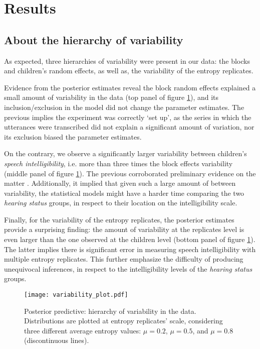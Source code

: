 \section{Results} \label{S:results}
%
\subsection{About the hierarchy of variability} \label{sS:results_variability}
%
As expected, three hierarchies of variability were present in our data: the blocks and children's random effects, as well as, the variability of the entropy replicates.

Evidence from the posterior estimates reveal the block random effects explained a small amount of variability in the data (top panel of figure \ref{fig:variability}), and its inclusion/exclusion in the model did not change the parameter estimates. The previous implies the experiment was correctly `set up', as the series in which the utterances were transcribed did not explain a significant amount of variation, nor its exclusion biased the parameter estimates.

On the contrary, we observe a significantly larger variability between children's \textit{speech intelligibility}, i.e. more than three times the block effects variability (middle panel of figure \ref{fig:variability}). The previous corroborated preliminary evidence on the matter \cite{Young_et_al_2002, Peng_et_al_2004, Montag_et_al_2014, Castellanos_et_al_2014, Yanbay_et_al_2014, Nittrouer_et_al_2014, Freeman_et_al_2017, Boonen_et_al_2021}. Additionally, it implied that given such a large amount of between variability, the statistical models might have a harder time comparing the two \textit{hearing status} groups, in respect to their location on the intelligibility scale.

Finally, for the variability of the entropy replicates, the posterior estimates provide a surprising finding: the amount of variability at the replicates level is even larger than the one observed at the children level (bottom panel of figure \ref{fig:variability}). The latter implies there is significant error in measuring speech intelligibility with multiple entropy replicates. This further emphasize the difficulty of producing unequivocal  inferences, in respect to the intelligibility levels of the \textit{hearing status} groups.
%
\begin{figure}[!h]
	\centering
	\texttt{[image: variability\_plot.pdf]}
	\caption[Posterior predictive: hierarchy of variability in the data]{Posterior predictive: hierarchy of variability in the data. Distributions are plotted at entropy replicates' scale, considering three different average entropy values: $\mu=0.2$, $\mu=0.5$, and $\mu=0.8$ (discontinuous lines). }
	\label{fig:variability}
\end{figure}
%
